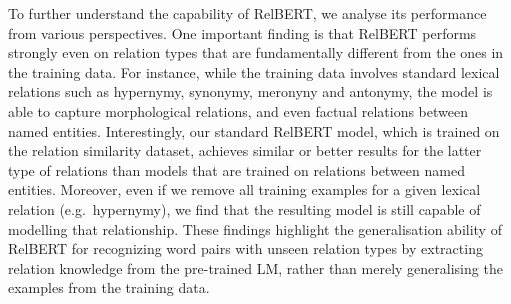 \documentclass[3p]{elsarticle}
\begin{document}
{To further understand the capability of RelBERT, we analyse its performance from various perspectives. One important finding is that RelBERT performs strongly even on relation types that are fundamentally different from the ones in the training data. For instance, while the training data involves standard lexical relations such as hypernymy, synonymy, meronyny and antonymy, the model is able to capture morphological relations, and even factual relations between named entities. Interestingly, our standard RelBERT model, which is trained on the relation similarity dataset, achieves similar or better results for the latter type of relations than models that are trained on relations between named entities. Moreover, even if we remove all training examples for a given lexical relation (e.g.\ hypernymy), we find that the resulting model is still capable of modelling that relationship. These findings highlight the generalisation ability of RelBERT for recognizing word pairs with unseen relation types by extracting relation knowledge from the pre-trained LM, rather than merely generalising the examples from the training data. 


}
\end{document}
